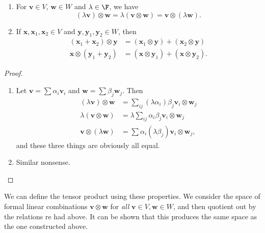 \documentclass[a4paper]{article}
\begin{document}
\begin{lemma}\leavevmode
  \begin{enumerate}
    \item For $\mathbf{v} \in V$, $\mathbf{w} \in W$ and $\lambda \in \F$, we have
      \[
        (\lambda \mathbf{v}) \otimes \mathbf{w} = \lambda (\mathbf{v} \otimes \mathbf{w}) = \mathbf{v} \otimes (\lambda \mathbf{w}).
      \]
    \item If $\mathbf{x}, \mathbf{x}_1, \mathbf{x}_2 \in V$ and $\mathbf{y}, \mathbf{y}_1, \mathbf{y}_2 \in W$, then
      \begin{align*}
        (\mathbf{x}_1 + \mathbf{x}_2) \otimes \mathbf{y} &= (\mathbf{x}_1 \otimes \mathbf{y}) + (\mathbf{x}_2 \otimes \mathbf{y})\\
        \mathbf{x}\otimes (\mathbf{y}_1 + \mathbf{y}_2) &= (\mathbf{x}\otimes \mathbf{y}_1) + (\mathbf{x} \otimes \mathbf{y}_2).
      \end{align*}
  \end{enumerate}
\end{lemma}

\begin{proof}\leavevmode
  \begin{enumerate}
    \item Let $\mathbf{v} = \sum \alpha_i \mathbf{v}_i$ and $\mathbf{w} = \sum \beta_j \mathbf{w}_j$. Then
      \begin{align*}
        (\lambda \mathbf{v}) \otimes \mathbf{w} &= \sum_{ij} (\lambda \alpha_i) \beta_j \mathbf{v}_i \otimes \mathbf{w}_j \\
        \lambda (\mathbf{v}\otimes \mathbf{w}) &= \lambda \sum_{ij} \alpha_i \beta_j \mathbf{v}_i \otimes \mathbf{w}_j\\
        \mathbf{v}\otimes (\lambda \mathbf{w}) &= \sum \alpha_i (\lambda \beta_j) \mathbf{v}_i \otimes \mathbf{w}_j,
      \end{align*}
      and these three things are obviously all equal.
    \item Similar nonsense.
  \end{enumerate}
\end{proof}
We can define the tensor product using these properties. We consider the space of formal linear combinations $\mathbf{v} \otimes \mathbf{w}$ for \emph{all} $\mathbf{v} \in V, \mathbf{w} \in W$, and then quotient out by the relations re had above. It can be shown that this produces the same space as the one constructed above.
\end{document}
